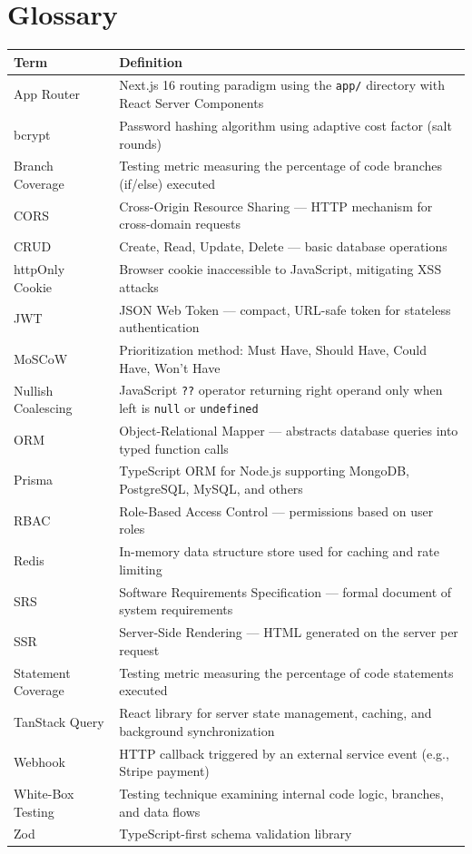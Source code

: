 \documentclass[12pt,a4paper]{report}
\begin{document}
\chapter*{Glossary}
\begin{center}
\begin{longtable}{lp{10cm}}
  \toprule
  \textbf{Term} & \textbf{Definition} \\
  \midrule
  \endhead
  App Router       & Next.js 16 routing paradigm using the \texttt{app/} directory with React Server Components \\
  bcrypt           & Password hashing algorithm using adaptive cost factor (salt rounds) \\
  Branch Coverage  & Testing metric measuring the percentage of code branches (if/else) executed \\
  CORS             & Cross-Origin Resource Sharing --- HTTP mechanism for cross-domain requests \\
  CRUD             & Create, Read, Update, Delete --- basic database operations \\
  httpOnly Cookie  & Browser cookie inaccessible to JavaScript, mitigating XSS attacks \\
  JWT              & JSON Web Token --- compact, URL-safe token for stateless authentication \\
  MoSCoW           & Prioritization method: Must Have, Should Have, Could Have, Won't Have \\
  Nullish Coalescing & JavaScript \texttt{??} operator returning right operand only when left is \texttt{null} or \texttt{undefined} \\
  ORM              & Object-Relational Mapper --- abstracts database queries into typed function calls \\
  Prisma           & TypeScript ORM for Node.js supporting MongoDB, PostgreSQL, MySQL, and others \\
  RBAC             & Role-Based Access Control --- permissions based on user roles \\
  Redis            & In-memory data structure store used for caching and rate limiting \\
  SRS              & Software Requirements Specification --- formal document of system requirements \\
  SSR              & Server-Side Rendering --- HTML generated on the server per request \\
  Statement Coverage & Testing metric measuring the percentage of code statements executed \\
  TanStack Query   & React library for server state management, caching, and background synchronization \\
  Webhook          & HTTP callback triggered by an external service event (e.g., Stripe payment) \\
  White-Box Testing & Testing technique examining internal code logic, branches, and data flows \\
  Zod              & TypeScript-first schema validation library \\
  \bottomrule
\end{longtable}
\end{center}
\end{document}
